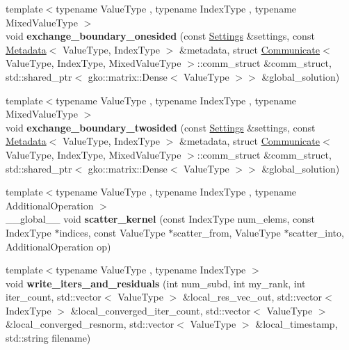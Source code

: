 \begin{DoxyCompactItemize}
\item 
\mbox{\label{namespaceschwz_a4c99059ae93f77311f4a14d28774c0d3}} 
{\footnotesize template$<$typename Value\+Type , typename Index\+Type , typename Mixed\+Value\+Type $>$ }\\void {\bfseries exchange\+\_\+boundary\+\_\+onesided} (const \hyperlink{structschwz_1_1Settings}{Settings} \&settings, const \hyperlink{structschwz_1_1Metadata}{Metadata}$<$ Value\+Type, Index\+Type $>$ \&metadata, struct \hyperlink{classschwz_1_1Communicate}{Communicate}$<$ Value\+Type, Index\+Type, Mixed\+Value\+Type $>$\+::comm\+\_\+struct \&comm\+\_\+struct, std\+::shared\+\_\+ptr$<$ gko\+::matrix\+::\+Dense$<$ Value\+Type $>$$>$ \&global\+\_\+solution)
\item 
\mbox{\label{namespaceschwz_a5c58f9da7e21d6671295b7b62f45b33f}} 
{\footnotesize template$<$typename Value\+Type , typename Index\+Type , typename Mixed\+Value\+Type $>$ }\\void {\bfseries exchange\+\_\+boundary\+\_\+twosided} (const \hyperlink{structschwz_1_1Settings}{Settings} \&settings, const \hyperlink{structschwz_1_1Metadata}{Metadata}$<$ Value\+Type, Index\+Type $>$ \&metadata, struct \hyperlink{classschwz_1_1Communicate}{Communicate}$<$ Value\+Type, Index\+Type, Mixed\+Value\+Type $>$\+::comm\+\_\+struct \&comm\+\_\+struct, std\+::shared\+\_\+ptr$<$ gko\+::matrix\+::\+Dense$<$ Value\+Type $>$$>$ \&global\+\_\+solution)
\item 
\mbox{\label{namespaceschwz_a1149b1cad510b1ae7285480c970fd2b3}} 
{\footnotesize template$<$typename Value\+Type , typename Index\+Type , typename Additional\+Operation $>$ }\\\+\_\+\+\_\+global\+\_\+\+\_\+ void {\bfseries scatter\+\_\+kernel} (const Index\+Type num\+\_\+elems, const Index\+Type $\ast$indices, const Value\+Type $\ast$scatter\+\_\+from, Value\+Type $\ast$scatter\+\_\+into, Additional\+Operation op)
\item 
\mbox{\label{namespaceschwz_af5437b273e3d364a2b3fa80929aeded9}} 
{\footnotesize template$<$typename Value\+Type , typename Index\+Type $>$ }\\void {\bfseries write\+\_\+iters\+\_\+and\+\_\+residuals} (int num\+\_\+subd, int my\+\_\+rank, int iter\+\_\+count, std\+::vector$<$ Value\+Type $>$ \&local\+\_\+res\+\_\+vec\+\_\+out, std\+::vector$<$ Index\+Type $>$ \&local\+\_\+converged\+\_\+iter\+\_\+count, std\+::vector$<$ Value\+Type $>$ \&local\+\_\+converged\+\_\+resnorm, std\+::vector$<$ Value\+Type $>$ \&local\+\_\+timestamp, std\+::string filename)

\end{DoxyCompactItemize}
